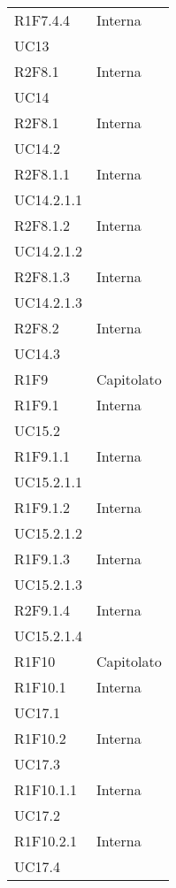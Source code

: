 \begin{longtable}{|C{6.5cm}|C{6.5cm}|}
	R1F7.4.4 &  \centering Interna \\ UC13 \tabularnewline


	R2F8.1 & \centering Interna \\ UC14 \tabularnewline

	R2F8.1 & \centering Interna \\ UC14.2 \tabularnewline

	R2F8.1.1 & \centering Interna \\ UC14.2.1.1 \tabularnewline

	R2F8.1.2 & \centering Interna \\ UC14.2.1.2 \tabularnewline

	R2F8.1.3 & \centering Interna \\ UC14.2.1.3 \tabularnewline


	R2F8.2 & \centering Interna \\ UC14.3 \tabularnewline

	R1F9 &  Capitolato \\

	R1F9.1 & \centering Interna \\ UC15.2 \tabularnewline

	R1F9.1.1 & \centering Interna \\ UC15.2.1.1 \tabularnewline

	R1F9.1.2 & \centering Interna \\ UC15.2.1.2 \tabularnewline

	R1F9.1.3 & \centering Interna \\ UC15.2.1.3 \tabularnewline

	R2F9.1.4 & \centering Interna \\ UC15.2.1.4 \tabularnewline

	R1F10 & Capitolato \\

	R1F10.1 &  \centering Interna \\ UC17.1 \tabularnewline

	R1F10.2 & \centering Interna \\ UC17.3 \tabularnewline

	R1F10.1.1 &  \centering Interna \\ UC17.2 \tabularnewline

	R1F10.2.1 &  \centering Interna \\ UC17.4 \tabularnewline


\end{longtable}
